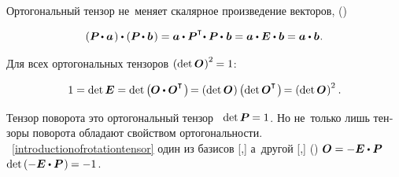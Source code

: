 \begin{otherlanguage}{russian}

Ортогональный тензор не~меняет скалярное произведение векторов,   ()

\nopagebreak\vspace{-0.1em}\begin{equation}\label{rotationtensorkeepsmetrics}
\left( \bm{P} \hspace{-0.2ex} \dotp \bm{a}\hspace{.2ex} \right) \dotp \left( \bm{P} \hspace{-0.2ex} \dotp \bm{b}\hspace{.2ex} \right)
= \bm{a} \dotp \bm{P}^{\T} \hspace{-0.4ex} \dotp \bm{P} \hspace{-0.1ex} \dotp \hspace{.1ex} \bm{b}
= \bm{a} \dotp \UnitDyad \dotp \bm{b}
= \bm{a} \dotp \bm{b}
\hspace{.1ex} .
\end{equation}

Для всех ортогональных тензоров ${\left(\operatorname{det} \bm{O}\hspace{.1ex}\right)^2 \hspace{-0.1ex} = 1}$:

\nopagebreak\vspace{-0.1em}\begin{equation*}
1 = \operatorname{det} \UnitDyad = \operatorname{det} \left({\hspace{-0.1ex} \rotationtensor \dotp \rotationtensor^{\T} \hspace{.2ex}}\right) \hspace{-0.3ex}
= \left({\operatorname{det} \rotationtensor \hspace{.1ex}}\right) \left({\operatorname{det} \rotationtensor^{\T} \hspace{.2ex}}\right) \hspace{-0.3ex}
= \left(\operatorname{det} \rotationtensor \hspace{.1ex} \right)^2
\hspace{.1ex} .
\end{equation*}

Тензор поворота это ортогональный тензор ~${\operatorname{det} \bm{P} \hspace{-0.1ex} = 1}$.
Но не~только лишь тензоры поворота обладают свойством ортогональности.
 ~\eqref{introductionofrotationtensor} один из базисов [,] а~другой [,]   () ${\rotationtensor = -\UnitDyad \dotp \bm{P}}$ ~${\operatorname{det} \left( -\UnitDyad \dotp \bm{P} \hspace{.16ex} \right) \hspace{-0.1ex} = -1}$.


\end{otherlanguage}
